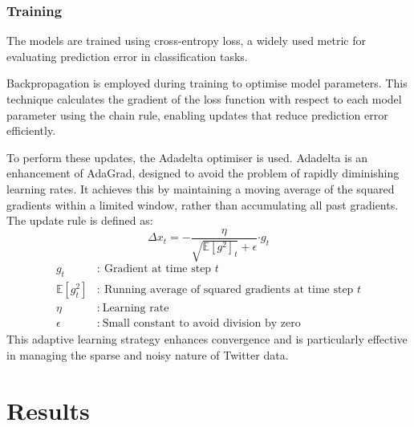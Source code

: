 \documentclass{article}
\begin{document}
\subsubsection{Training}

The models are trained using cross-entropy loss, a widely used metric for evaluating prediction error in classification tasks.

Backpropagation is employed during training to optimise model parameters. This technique calculates the gradient of the loss function with respect to each model parameter using the chain rule, enabling updates that reduce prediction error efficiently.

To perform these updates, the Adadelta optimiser is used. Adadelta is an enhancement of AdaGrad, designed to avoid the problem of rapidly diminishing learning rates. It achieves this by maintaining a moving average of the squared gradients within a limited window, rather than accumulating all past gradients. The update rule is defined as:
\[
\Delta x_t = - \frac{\eta }{\sqrt{\mathbb{E}[g^2]_t} + \epsilon}{\cdot g_t}
\]
\[
\begin{aligned}
g_t &:\ \text{Gradient at time step } t \\
\mathbb{E}[g_t^2] &:\ \text{Running average of squared gradients at time step } t \\
\eta &:\ \text{Learning rate} \\
\epsilon &:\ \text{Small constant to avoid division by zero}
\end{aligned}
\]
This adaptive learning strategy enhances convergence and is particularly effective in managing the sparse and noisy nature of Twitter data.


\section{Results}
\end{document}
